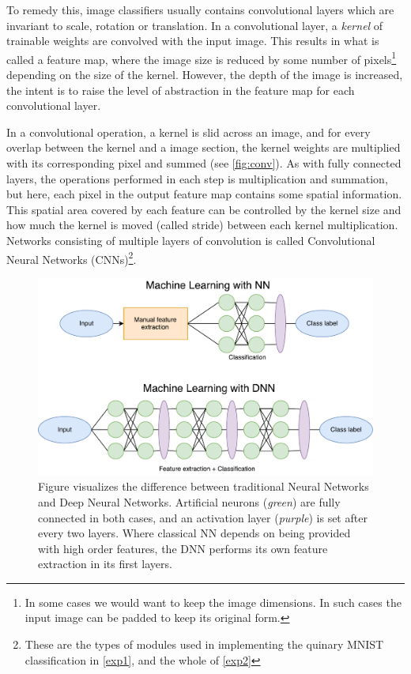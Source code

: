To remedy this, image classifiers usually contains convolutional layers which are invariant to scale, rotation or translation. In a convolutional layer, a \textit{kernel} of trainable weights are convolved with the input image. This results in what is called a feature map, where the image size is reduced by some number of pixels\footnote{In some cases we would want to keep the image dimensions. In such cases the input image can be padded to keep its original form.} depending on the size of the kernel. However, the depth of the image is increased, the intent is to raise the level of abstraction in the feature map for each convolutional layer. 

In a convolutional operation, a kernel is slid across an image, and for every overlap between the kernel and a image section, the kernel weights are multiplied with its corresponding pixel and summed (see \ref{fig:conv}). As with fully connected layers, the operations performed in each step is multiplication and summation, but here, each pixel in the output feature map contains some spatial information.
This spatial area covered by each feature can be controlled by the kernel size and how much the kernel is moved (called stride) between each kernel multiplication.
Networks consisting of multiple layers of convolution is called Convolutional Neural Networks (CNNs)\footnote{These are the types of modules used in implementing the quinary MNIST classification in \ref{exp1}, and the whole of \ref{exp2}}.

\begin{figure}[ht] 
    \centering
    \includegraphics[width=\linewidth]{Chapters/2.Background/figures/NNvsDNN.pdf}
    \caption[NN vs DNN]{Figure visualizes the difference between traditional Neural Networks and Deep Neural Networks. Artificial neurons (\textit{green}) are fully connected in both cases, and an activation layer (\textit{purple}) is set after every two layers. Where classical NN depends on being provided with high order features, the DNN performs its own feature extraction in its first layers.}
    \label{fig:NNvsDNN}
\end{figure}

